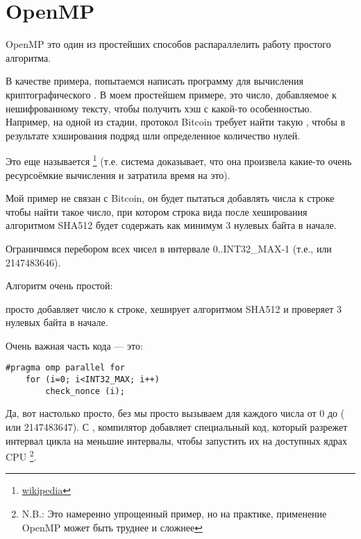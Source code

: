 \section{OpenMP}
\label{openmp}

OpenMP это один из простейших способов распараллелить работу простого алгоритма.

В качестве примера, попытаемся написать программу для вычисления криптографического .
В моем простейшем примере,  это число, добавляемое к нешифрованному тексту, чтобы получить
хэш с какой-то особенностью.
Например, на одной из стадии, протокол Bitcoin требует найти такую , чтобы в результате
хэширования подряд шли определенное количество нулей.

Это еще называется 
\footnote{\href{http://go.yurichev.com/17100}{wikipedia}} 
(т.е. система доказывает, что она произвела какие-то очень ресурсоёмкие вычисления и затратила
время на это).

Мой пример не связан с Bitcoin, 
он будет пытаться добавлять числа к строке 
чтобы найти такое число, при котором строка вида 
 после хеширования алгоритмом SHA512 будет содержать как минимум 3 нулевых
байта в начале.

Ограничимся перебором всех чисел в интервале
0..INT32\_MAX-1 (т.е.,  или 2147483646).

Алгоритм очень простой:



 просто добавляет число к строке, хеширует алгоритмом SHA512 и проверяет 
3 нулевых байта в начале.

Очень важная часть кода --- это:

\begin{lstlisting}[style=customc]
	#pragma omp parallel for
	for (i=0; i<INT32_MAX; i++)
		check_nonce (i);
\end{lstlisting}

Да, вот настолько просто, без  мы просто вызываем
  для каждого числа от 0 до 
 ( или 2147483647).
С , компилятор добавляет специальный код, который разрежет интервал цикла
на меньшие интервалы, чтобы запустить их на доступных ядрах \ac{CPU}
\footnote{N.B.: Это намеренно упрощенный пример, но на практике, 
применение OpenMP может быть труднее и сложнее}.

